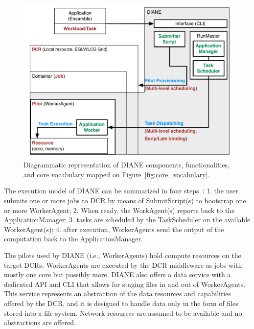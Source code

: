 \documentclass{sig-alternate}
\begin{document}
\begin{figure}[t]
    \centering
        \includegraphics[width=.48\textwidth]{figures/diane_comparison.pdf}
    \caption{Diagrammatic representation of DIANE components, functionalities,
    and core vocabulary mapped on Figure~\ref{fig:core_vocabulary}.}
    \label{fig:diane_comparison}
\end{figure}

The execution model of DIANE can be summarized in four
steps~\cite{moscicki2011understanding}: 1. the user submits one or more jobs to
DCR by means of SubmitScript(s) to bootstrap one or more WorkerAgent; 2. When
ready, the WorkAgent(s) reports back to the ApplicationManager; 3. tasks are
scheduled by the TaskScheduler on the available WorkerAgent(s); 4. after
execution, WorkerAgents send the output of the computation back to the
ApplicationManager.

 


The pilots used by DIANE (i.e., WorkerAgents) hold compute resources on the
target DCRs. WorkerAgents are executed by the DCR middleware as jobs with mostly
one core but possibly more. DIANE also offers a data service with a dedicated
API and CLI that allows for staging files in and out of WorkerAgents. This
service represents an abstraction of the data resources and capabilities offered
by the DCR, and it is designed to handle data only in the form of files stored
into a file system. Network resources are assumed to be available and no
abstractions are offered.

\end{document}
